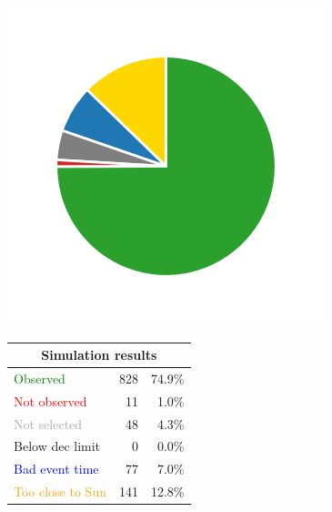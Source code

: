 \begin{colsection}
\begin{colsection}
\begin{figure}[p]
    \begin{center}
        \begin{minipage}[t]{0.2\textwidth}\vspace{10pt}
            \includegraphics[width=\linewidth]{images/gw_sims/2n8+2k8_pie.png}
        \end{minipage}
        \begin{minipage}[t]{0.37\textwidth}\vspace{0pt}
            \begin{tabular}{lrr}
                \multicolumn{3}{c}{\textbf{Simulation results}} \\
                \midrule
                \textcolor{Green}{Observed} & 828 & 74.9\% \\
                \textcolor{Red}{Not observed} & 11 & 1.0\% \\
                \textcolor{darkgray}{Not selected} & 48 & 4.3\% \\
                \textcolor{NavyBlue}{Below dec limit} & 0 & 0.0\% \\
                \textcolor{Blue}{Bad event time} & 77 & 7.0\% \\
                \textcolor{Orange}{Too close to Sun} & 141 & 12.8\% \\

\end{tabular}
\end{minipage}
\end{center}
\end{figure}
\end{colsection}
\end{colsection}
